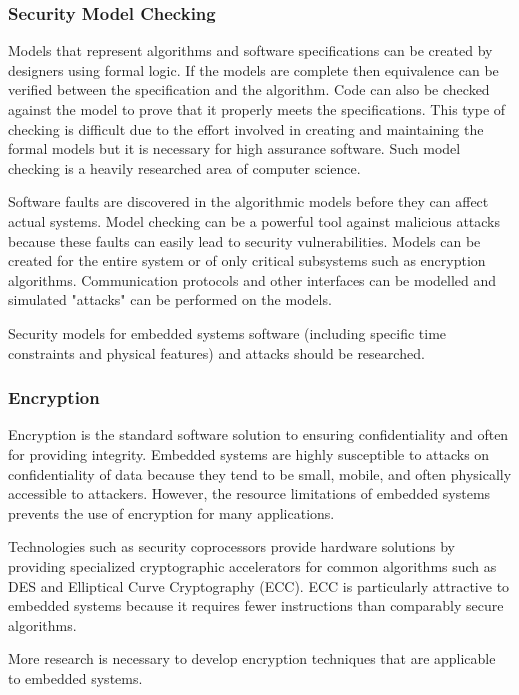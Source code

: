 \documentclass[final,conference,10pt]{IEEEtran}
\begin{document}
\subsubsection{Security Model Checking}
Models that represent algorithms and software specifications can be created by designers using formal logic.  If the models are complete then equivalence can be verified between the specification and the algorithm. Code can also be checked against the model to prove that it properly meets the specifications.  This type of checking is difficult due to the effort involved in creating and maintaining the formal models but it is necessary for high assurance software.  Such model checking is a heavily researched area of computer science.  

Software faults are discovered in the algorithmic models before they can affect actual systems.  Model checking can be a powerful tool against malicious attacks because these faults can easily lead to security vulnerabilities.  Models can be created for the entire system or of only critical subsystems such as encryption algorithms.  Communication protocols and other interfaces can be modelled and simulated "attacks" can be performed on the models.   \cite{Probabilistic Attack Scenarios to Evaluate Policies over Communication Protocols}

Security models for embedded systems software (including specific time constraints and physical features) and attacks should be researched.

\subsubsection{Encryption}
Encryption is the standard software solution to ensuring confidentiality and often for providing integrity.  Embedded systems are highly susceptible to attacks on confidentiality of data because they tend to be small, mobile, and often physically accessible to attackers.  However, the resource limitations of embedded systems prevents the use of encryption for many applications. 

Technologies such as security coprocessors provide hardware solutions by providing specialized cryptographic accelerators for common algorithms such as DES and Elliptical Curve Cryptography (ECC).  ECC is particularly attractive to embedded systems because it requires fewer instructions than comparably secure algorithms.  

More research is necessary to develop encryption techniques that are applicable to embedded systems.
\end{document}
